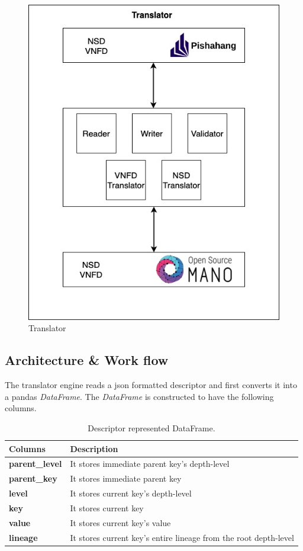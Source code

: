 \begin{figure}
	\centering
	\includegraphics[width=0.8\linewidth]{"figures/Translator"}
	\caption{Translator}
	\label{fig:service-descriptor-translator}
\end{figure}

\subsection{Architecture \& Work flow}
The translator engine reads a json formatted descriptor and first converts it into a pandas \textit{DataFrame}. The \textit{DataFrame} is constructed to have the following columns.

\begin{table}[H]
	\begin{center}
		\caption{Descriptor represented DataFrame.}
		\label{tab:table1}
		\begin{tabular}{l|l} %
			\textbf{Columns} & \textbf{Description} \\
			\hline
			\textbf{parent\_level} & It stores immediate parent key's depth-level \\ 
			\textbf{parent\_key} & It stores immediate parent key  \\
			\textbf{level} & It stores current key's depth-level \\
			\textbf{key} & It stores current key \\
			\textbf{value} & It stores current key's value \\
			\textbf{lineage} & It stores current key's entire lineage from the root depth-level \\  
		\end{tabular}
	\end{center}
\end{table}
